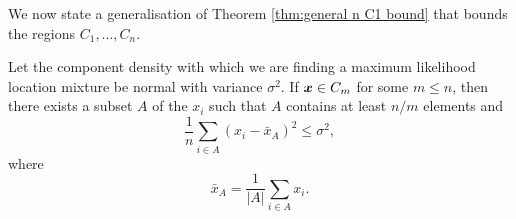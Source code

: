 	
	We now state a generalisation of Theorem \ref{thm:general n C1 bound} that bounds the regions $C_1, \dots, C_n$.

	\label{sec:bounding Cm}
		\begin{theorem}
			Let the component density with which we are finding a maximum likelihood location mixture be normal with variance $\sigma^2$. If ${\bm{{x}}} \in C_m$ for some $m \leq n$, then there exists a subset $A$ of the $x_i$ such that $A$ contains at least $n/m$ elements and
			\begin{equation}
				\frac{1}{n} \sum_{i \in A} \left(x_i - \bar{x}_A\right)^2 \leq \sigma^2,
			\end{equation}
			where
			\begin{equation}
				\bar{x}_A = \frac{1}{|A|}\sum_{i \in A} x_i.
			\end{equation}
			\label{thm:general n constraints result}
		\end{theorem}
